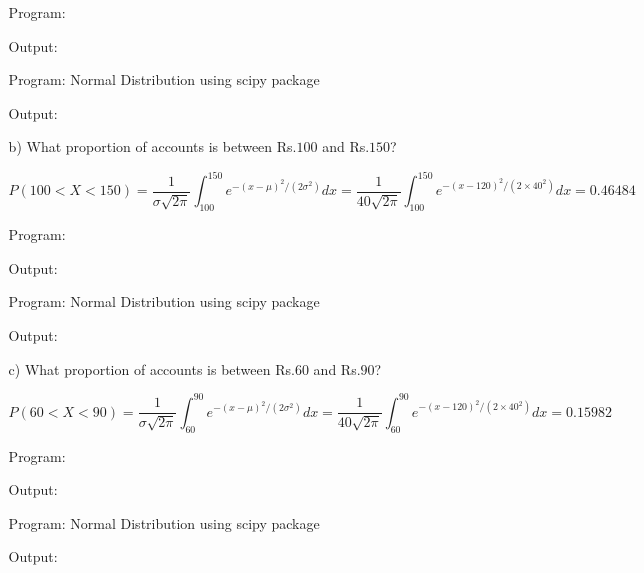 \documentclass[a4paper,10pt,openright]{report}
\begin{document}
\begin{enumerate}
\begin{enumerate}
Program:

Output:


Program: Normal Distribution using scipy package

Output:


\item[b)] What proportion of accounts is between Rs.$100$ and Rs.$150$?

\begin{equation*}
P(100 < X < 150) = \frac{1}{\sigma\sqrt{2\pi}} \int_{100}^{150} e^{-(x-\mu)^2/(2\sigma^{2})} dx 
		= \frac{1}{40\sqrt{2\pi}} \int_{100}^{150} e^{-(x-120)^2/(2 \times 40^{2})} dx 
		= 0.46484
\end{equation*}

Program:

Output:


Program: Normal Distribution using scipy package

Output:


\item[c)] What proportion of accounts is between Rs.$60$ and Rs.$90$?

\begin{equation*}
P(60 < X < 90) = \frac{1}{\sigma\sqrt{2\pi}} \int_{60}^{90} e^{-(x-\mu)^2/(2\sigma^{2})} dx 
		= \frac{1}{40\sqrt{2\pi}} \int_{60}^{90} e^{-(x-120)^2/(2 \times 40^{2})} dx 
		= 0.15982
\end{equation*}

Program:

Output:


Program: Normal Distribution using scipy package

Output:

\end{enumerate}

\end{enumerate}
\end{document}
